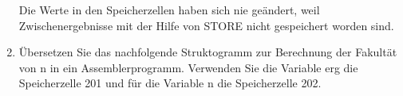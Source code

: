 \documentclass{lehramt-informatik-aufgabe}
\begin{document}
\begin{enumerate}

Die Werte in den Speicherzellen haben sich nie geändert, weil
Zwischenergebnisse mit der Hilfe von STORE nicht gespeichert worden
sind.


\item Übersetzen Sie das nachfolgende Struktogramm zur Berechnung der
Fakultät von n in ein Assemblerprogramm. Verwenden Sie die Variable erg
die Speicherzelle 201 und für die Variable n die Speicherzelle 202.

\end{enumerate}
\end{document}
